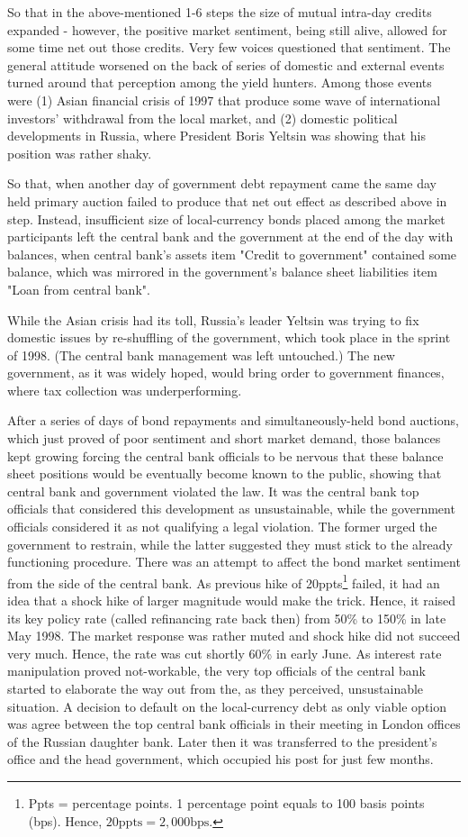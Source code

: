 So that in the above-mentioned 1-6 steps the size of mutual intra-day credits expanded - however, the positive market sentiment, being still alive, allowed for some time net out those credits. Very few voices questioned that sentiment. The general attitude worsened on the back of series of domestic and external events turned around that perception among the yield hunters. 
Among those events were (1) Asian financial crisis of 1997 that produce some wave of international investors' withdrawal from the local market, and (2) domestic political developments in Russia, where President Boris Yeltsin was showing that his position was rather shaky. 

So that, when another day of government debt repayment came the same day held primary auction failed to produce that net out effect as described above in step. Instead, insufficient size of local-currency bonds placed among the market participants left the central bank and the government at the end of the day with balances, when central bank's assets item "Credit to government" contained some balance, which was mirrored in the government's balance sheet liabilities item "Loan from central bank". 

While the Asian crisis had its toll, Russia's leader Yeltsin was trying to fix domestic issues by re-shuffling of the government, which took place in the sprint of 1998. (The central bank management was left untouched.) The new government, as it was widely hoped, would bring order to government finances, where tax collection was underperforming. 

After a series of days of bond repayments and simultaneously-held bond auctions, which just proved of poor sentiment and short market demand, those balances kept growing forcing the central bank officials to be nervous that these balance sheet positions would be eventually become known to the public, showing that central bank and government violated the law. It was the central bank top officials that considered this development as unsustainable, while the government officials considered it as not qualifying a legal violation. The former urged the government to restrain, while the latter suggested they must stick to the already functioning procedure. There was an attempt to affect the bond market sentiment from the side of the central bank. As previous hike of 20ppts\footnote{Ppts = percentage points. 1 percentage point equals to 100 basis points (bps). Hence, $20 \text{ppts} = 2,000 \text{bps}$.} failed, it had an idea that a shock hike of larger magnitude would make the trick. Hence, it raised its key policy rate (called refinancing rate back then) from 50\% to 150\% in late May 1998. The market response was rather muted and shock hike did not succeed very much. Hence, the rate was cut shortly 60\% in early June. As interest rate manipulation proved not-workable, the very top officials of the central bank started to elaborate the way out from the, as they perceived, unsustainable situation. A decision to default on the local-currency debt as only viable option was agree between the top central bank officials in their meeting in London offices of the Russian daughter bank. Later then it was transferred to the president's office and the head government, which occupied his post for just few months.

